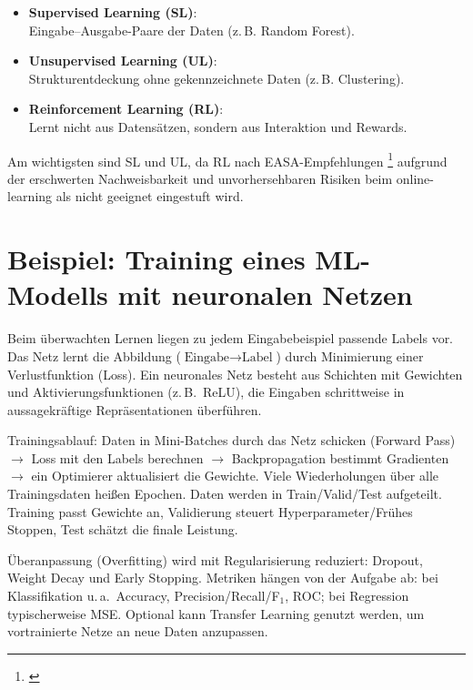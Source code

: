 \medskip
\begin{itemize}
  \item \textbf{Supervised Learning (SL)}:\\ Eingabe–Ausgabe-Paare der Daten (z.\,B. Random Forest).
  \item \textbf{Unsupervised Learning (UL)}:\\ Strukturentdeckung ohne gekennzeichnete Daten (z.\,B. Clustering).
  \item \textbf{Reinforcement Learning (RL)}:\\ Lernt nicht aus Datensätzen, sondern aus Interaktion und Rewards.
\end{itemize}
\medskip

Am wichtigsten sind SL und UL, da RL nach EASA-Empfehlungen \footnote{ \parencite{easa-ai-concept-issue2-2024}} 
aufgrund der erschwerten Nachweisbarkeit und unvorhersehbaren Risiken beim online-learning als nicht geeignet eingestuft wird.

\section{Beispiel: Training eines ML-Modells mit neuronalen Netzen}\label{sec:nn-train-kompakt}
Beim überwachten Lernen liegen zu jedem Eingabebeispiel passende Labels vor. Das Netz lernt die Abbildung 
(\(\text{Eingabe}\!\rightarrow\!\text{Label}\)) durch Minimierung einer Verlustfunktion (Loss). Ein neuronales Netz besteht aus
Schichten mit Gewichten und Aktivierungsfunktionen (z.\,B.\ ReLU), die Eingaben schrittweise in
aussagekräftige Repräsentationen überführen.

\medskip
Trainingsablauf: Daten in Mini-Batches durch das Netz schicken (Forward Pass) \(\rightarrow\) Loss mit den
Labels berechnen \(\rightarrow\) Backpropagation bestimmt Gradienten \(\rightarrow\) ein Optimierer aktualisiert
die Gewichte. Viele Wiederholungen über alle Trainingsdaten heißen Epochen. Daten werden in Train/Valid/Test aufgeteilt.
Training passt Gewichte an, Validierung steuert Hyperparameter/Frühes Stoppen, Test schätzt die finale Leistung.

\medskip
Überanpassung (Overfitting) wird mit Regularisierung reduziert: Dropout, Weight Decay und Early Stopping.
Metriken hängen von der Aufgabe ab: bei Klassifikation u.\,a.\ Accuracy, Precision/Recall/F\(_1\), ROC; bei
Regression typischerweise MSE. Optional kann Transfer Learning genutzt werden, um vortrainierte Netze an neue Daten anzupassen.






